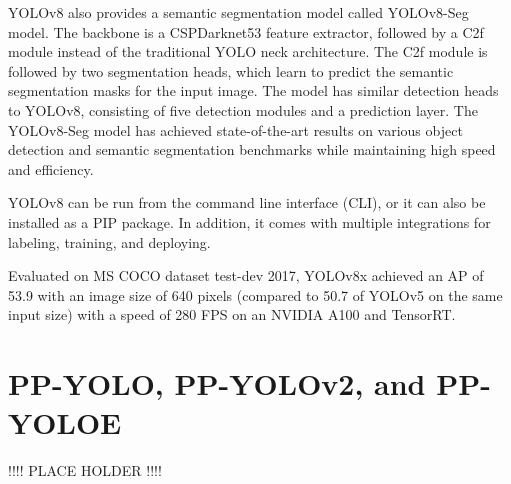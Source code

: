 \documentclass{article}
\begin{document}
YOLOv8 also provides a semantic segmentation model called YOLOv8-Seg model. The backbone is a CSPDarknet53 feature extractor, followed by a C2f module instead of the traditional YOLO neck architecture. The C2f module is followed by two segmentation heads, which learn to predict the semantic segmentation masks for the input image. The model has similar detection heads to YOLOv8, consisting of five detection modules and a prediction layer. The YOLOv8-Seg model has achieved state-of-the-art results on various object detection and semantic segmentation benchmarks while maintaining high speed and efficiency.

YOLOv8 can be run from the command line interface (CLI), or it can also be installed as a PIP package. In addition, it comes with multiple integrations for labeling, training, and deploying. 

Evaluated on MS COCO dataset test-dev 2017, YOLOv8x achieved an AP of 53.9 with an image size of 640 pixels (compared to 50.7 of YOLOv5 on the same input size) with a speed of 280 FPS on an NVIDIA A100 and TensorRT.



\section{PP-YOLO, PP-YOLOv2, and PP-YOLOE}

!!!! PLACE HOLDER !!!!
\end{document}
